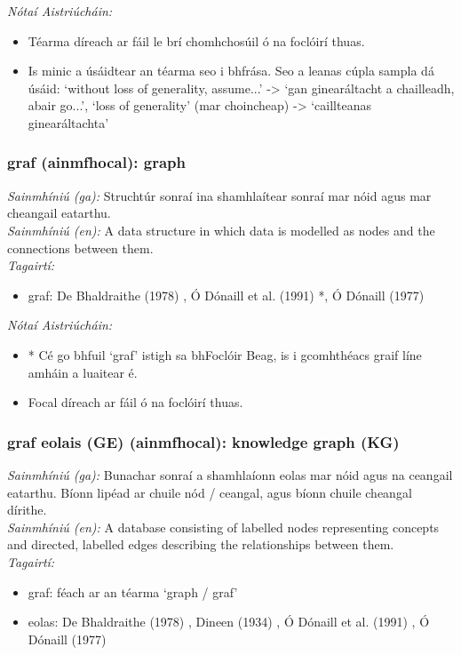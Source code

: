 \documentclass{article}
\begin{document}
 \noindent \textit{Nótaí Aistriúcháin:}
\begin{itemize}
	\item Téarma díreach ar fáil le brí chomhchosúil ó na foclóirí thuas.
	\item Is minic a úsáidtear an téarma seo i bhfrása. Seo a leanas cúpla sampla dá úsáid: `without loss of generality, assume...' -> `gan ginearáltacht a chailleadh, abair go...', `loss of generality' (mar choincheap) -> `caillteanas ginearáltachta'
\end{itemize}


\subsubsection*{graf (ainmfhocal): graph}
 \noindent \textit{Sainmhíniú (ga):} Struchtúr sonraí ina shamhlaítear sonraí mar nóid agus mar cheangail eatarthu.
\\
 \noindent \textit{Sainmhíniú (en):} A data structure in which data is modelled as nodes and the connections between them.
\\
 \noindent \textit{Tagairtí:}
\begin{itemize}
	\item graf: De Bhaldraithe (1978) \cite{de-bhaldraithe}, Ó Dónaill et al. (1991) \cite{focloir-beag}*, Ó Dónaill (1977) \cite{odonaill}
\end{itemize}

 \noindent \textit{Nótaí Aistriúcháin:}
\begin{itemize}
	\item * Cé go bhfuil `graf' istigh sa bhFoclóir Beag, is i gcomhthéacs graif líne amháin a luaitear é.
	\item Focal díreach ar fáil ó na foclóirí thuas.
\end{itemize}


\subsubsection*{graf eolais (GE) (ainmfhocal): knowledge graph (KG)}
 \noindent \textit{Sainmhíniú (ga):} Bunachar sonraí a shamhlaíonn eolas mar nóid agus na ceangail eatarthu. Bíonn lipéad ar chuile nód / ceangal, agus bíonn chuile cheangal dírithe.
\\
 \noindent \textit{Sainmhíniú (en):} A database consisting of labelled nodes representing concepts and directed, labelled edges describing the relationships between them.
\\
 \noindent \textit{Tagairtí:}
\begin{itemize}
	\item graf: féach ar an téarma `graph / graf'
	\item eolas: De Bhaldraithe (1978) \cite{de-bhaldraithe}, Dineen (1934) \cite{dineen}, Ó Dónaill et al. (1991) \cite{focloir-beag}, Ó Dónaill (1977) \cite{odonaill}
\end{itemize}
\end{document}
